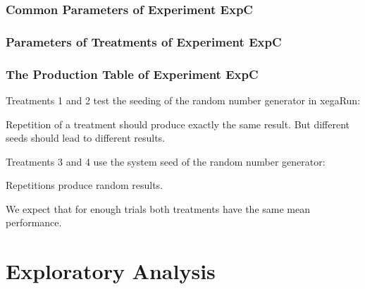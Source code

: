 \documentclass[18pt,c]{beamer}
\begin{document}
 \begin{frame}
 \fontsize{8pt}{9pt}\selectfont
 \frametitle{ Common Parameters of Experiment ExpC }

 \label{ExpCCommonTable001.tex}  
 \end{frame}

 \begin{frame}
 \fontsize{8pt}{9pt}\selectfont
 \frametitle{ Parameters of Treatments of Experiment ExpC }

 \label{ExpCDifferentTable000.tex}  
 \end{frame}

 \begin{frame}
 \fontsize{8pt}{9pt}\selectfont
 \frametitle{ The Production Table of Experiment ExpC }

 \label{ExpCGrammarTable000.tex}  
 \end{frame}

\begin{frame}
\vspace*{2mm}
\begin{block}{

}
Treatments 1 and 2 test the seeding of the random number generator in xegaRun:
 
Repetition of a treatment should produce exactly the same result.
But different seeds should lead to different results.
 
Treatments 3 and 4 use the system seed of the random number generator:
 
Repetitions produce random results.
 
We expect that for enough trials both treatments have the same mean performance.
\end{block}
\end{frame}%
\clearpage
\section{Exploratory Analysis}
\end{document}
